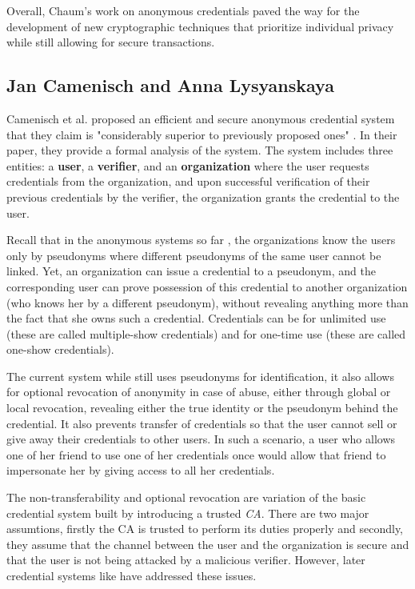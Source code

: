 Overall, Chaum's work on anonymous credentials paved the way for the development of new cryptographic techniques that prioritize individual privacy while still allowing for secure transactions.

\subsection*{Jan Camenisch and Anna Lysyanskaya}
Camenisch et al. proposed an efficient and secure anonymous credential system that they claim is "considerably superior to previously proposed ones" \cite{Camenisch2001AnES}. In their paper, they provide a formal analysis of the system.  The system includes three entities: a \textbf{user}, a \textbf{verifier}, and an \textbf{organization} where the user requests credentials from the organization, and upon successful verification of their previous credentials by the verifier, the organization grants the credential to the user.

Recall that in the anonymous systems so far \cite{Chaum1985, annaPsuedonym}, the organizations know the users only by pseudonyms where different pseudonyms of the same user cannot be linked. Yet, an organization can issue a credential to a pseudonym, and the corresponding user can prove possession of this
credential to another organization (who knows her by a different pseudonym), without revealing anything more than the fact that she owns such a credential. Credentials can
be for unlimited use (these are called multiple-show credentials) and for one-time use (these are called one-show credentials). 

The current system while still uses pseudonyms for identification, it also allows for optional revocation of anonymity in case of abuse, either through global or local revocation, revealing either the true identity or the pseudonym behind the credential. It also prevents transfer of credentials so that the user cannot sell or give away their credentials to other users. In such a scenario, a user who allows one of her friend to use one of her credentials once would allow that friend to impersonate her by giving access to all her credentials.

The non-transferability and optional revocation are variation of the basic credential system built by introducing a trusted \textit{CA}. There are two major assumtions, firstly the CA is trusted to perform its duties properly and secondly, they assume that the channel between the user and the organization is secure and that the user is not being attacked by a malicious verifier. However, later credential systems like \cite{Wang2019} have addressed these issues.


